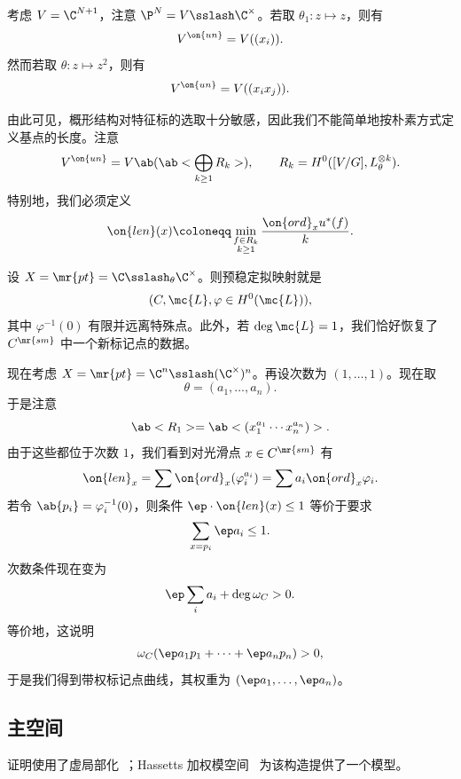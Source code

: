 \begin{exm}
    考虑 \(V = \C^{N+1}\)，注意 \(\P^N = V \sslash \C^{\times}\)。若取 \(\theta_1 \colon z \mapsto z\)，则有
    \[ V^{\on{un}} = V((x_i)). \]
    然而若取 \(\theta \colon z \mapsto z^2\)，则有
    \[ V^{\on{un}} = V((x_i x_j)). \]
\end{exm}

由此可见，概形结构对特征标的选取十分敏感，因此我们不能简单地按朴素方式定义基点的长度。注意
\[ V^{\on{un}} = V\ab(\ab< \bigoplus_{k \geq 1} R_k>), \qquad R_k = H^0([V/G], L_{\theta}^{\otimes k}). \]
特别地，我们必须定义
\[ \on{len}(x) \coloneqq \min_{\substack{f \in R_k \\ k \geq 1}} \frac{\on{ord}_x u^*(f)}{k}. \]

\begin{exm}
    设 \(X = \mr{pt} = \C \sslash_{\theta} \C^{\times}\)。则预稳定拟映射就是
    \[ (C, \mc{L}, \varphi \in H^0(\mc{L})), \]
    其中 \(\varphi^{-1}(0)\) 有限并远离特殊点。此外，若 \(\deg \mc{L} = 1\)，我们恰好恢复了 \(C^{\mr{sm}}\) 中一个新标记点的数据。
\end{exm}

\begin{exm}
    现在考虑 \(X = \mr{pt} = \C^n \sslash (\C^{\times})^n\)。再设次数为 \((1, \ldots, 1)\)。现在取
    \[ \theta = (a_1, \ldots, a_n). \]
    于是注意
    \[ \ab<R_1> = \ab<(x_1^{a_1} \cdots x_n^{a_n})>. \]
    由于这些都位于次数 \(1\)，我们看到对光滑点 \(x \in C^{\mr{sm}}\) 有
    \[ \on{len}_x = \sum \on{ord}_x (\varphi_i^{a_i}) = \sum a_i \on{ord}_x \varphi_i. \]
    若令 \(\ab\{p_i\} = \varphi_i^{-1}(0)\)，则条件 \(\ep \cdot \on{len}(x) \leq 1\) 等价于要求
    \[ \sum_{x = p_i} \ep a_i \leq 1. \]
    次数条件现在变为
    \[ \ep \sum_i a_i + \deg \omega_C > 0. \]
    等价地，这说明
    \[ \omega_C(\ep a_1 p_1 + \cdots + \ep a_n p_n) > 0, \]
    于是我们得到带权标记点曲线，其权重为 \((\ep a_1, \ldots, \ep a_n)\)。
\end{exm}

\subsection{主空间}%
\label{sub:Master space}

证明使用了虚局部化~\cite{GP1999}；Hassett\textquotesingle s 加权模空间~\cite{Hassett2003} 为该构造提供了一个模型。

